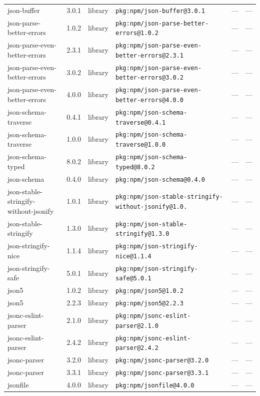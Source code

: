 \documentclass[11pt]{article}
\begin{document}
\begin{longtable}{|l|l|l|p{2.2cm}|l|p{4cm}|}
json-buffer & 3.0.1 & library & \texttt{pkg:npm/json-buffer@3.0.1} & — & — \\
json-parse-better-errors & 1.0.2 & library & \texttt{pkg:npm/json-parse-better-errors@1.0.2} & — & — \\
json-parse-even-better-errors & 2.3.1 & library & \texttt{pkg:npm/json-parse-even-better-errors@2.3.1} & — & — \\
json-parse-even-better-errors & 3.0.2 & library & \texttt{pkg:npm/json-parse-even-better-errors@3.0.2} & — & — \\
json-parse-even-better-errors & 4.0.0 & library & \texttt{pkg:npm/json-parse-even-better-errors@4.0.0} & — & — \\
json-schema-traverse & 0.4.1 & library & \texttt{pkg:npm/json-schema-traverse@0.4.1} & — & — \\
json-schema-traverse & 1.0.0 & library & \texttt{pkg:npm/json-schema-traverse@1.0.0} & — & — \\
json-schema-typed & 8.0.2 & library & \texttt{pkg:npm/json-schema-typed@8.0.2} & — & — \\
json-schema & 0.4.0 & library & \texttt{pkg:npm/json-schema@0.4.0} & — & — \\
json-stable-stringify-without-jsonify & 1.0.1 & library & \texttt{pkg:npm/json-stable-stringify-without-jsonify@1.0.} & — & — \\
json-stable-stringify & 1.3.0 & library & \texttt{pkg:npm/json-stable-stringify@1.3.0} & — & — \\
json-stringify-nice & 1.1.4 & library & \texttt{pkg:npm/json-stringify-nice@1.1.4} & — & — \\
json-stringify-safe & 5.0.1 & library & \texttt{pkg:npm/json-stringify-safe@5.0.1} & — & — \\
json5 & 1.0.2 & library & \texttt{pkg:npm/json5@1.0.2} & — & — \\
json5 & 2.2.3 & library & \texttt{pkg:npm/json5@2.2.3} & — & — \\
jsonc-eslint-parser & 2.1.0 & library & \texttt{pkg:npm/jsonc-eslint-parser@2.1.0} & — & — \\
jsonc-eslint-parser & 2.4.2 & library & \texttt{pkg:npm/jsonc-eslint-parser@2.4.2} & — & — \\
jsonc-parser & 3.2.0 & library & \texttt{pkg:npm/jsonc-parser@3.2.0} & — & — \\
jsonc-parser & 3.3.1 & library & \texttt{pkg:npm/jsonc-parser@3.3.1} & — & — \\
jsonfile & 4.0.0 & library & \texttt{pkg:npm/jsonfile@4.0.0} & — & — \\

\end{longtable}
\end{document}

